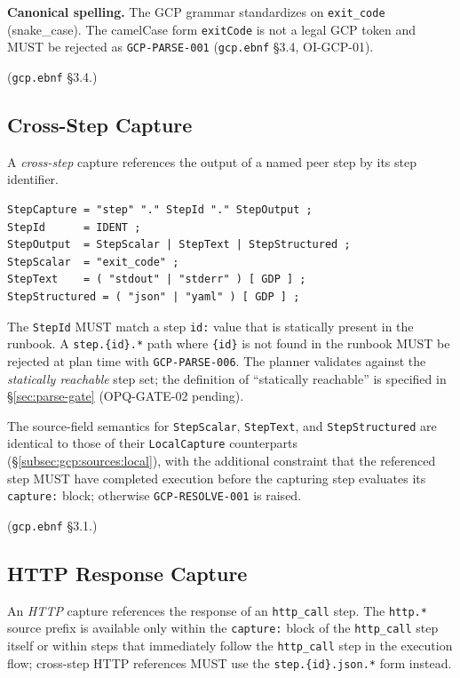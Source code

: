 \noindent\textbf{Canonical spelling.}
The GCP grammar standardizes on \texttt{exit\_code} (snake\_case).
The camelCase form \texttt{exitCode} is not a legal GCP token and MUST be
rejected as \texttt{GCP-PARSE-001} (\texttt{gcp.ebnf} \S3.4, OI-GCP-01).

(\texttt{gcp.ebnf} \S3.4.)

\subsection{Cross-Step Capture}
\label{subsec:gcp:sources:step}

A \emph{cross-step} capture references the output of a named peer step
by its step identifier.

\begin{verbatim}
StepCapture = "step" "." StepId "." StepOutput ;
StepId      = IDENT ;
StepOutput  = StepScalar | StepText | StepStructured ;
StepScalar  = "exit_code" ;
StepText    = ( "stdout" | "stderr" ) [ GDP ] ;
StepStructured = ( "json" | "yaml" ) [ GDP ] ;
\end{verbatim}

The \texttt{StepId} MUST match a step \texttt{id:} value that is
statically present in the runbook.
A \texttt{step.\{id\}.*} path where \texttt{\{id\}} is not found in the
runbook MUST be rejected at plan time with \texttt{GCP-PARSE-006}.
The planner validates against the \emph{statically reachable} step set;
the definition of ``statically reachable'' is specified in
\S\ref{sec:parse-gate} (OPQ-GATE-02 pending).

The source-field semantics for \texttt{StepScalar}, \texttt{StepText},
and \texttt{StepStructured} are identical to those of their
\texttt{LocalCapture} counterparts (\S\ref{subsec:gcp:sources:local}),
with the additional constraint that the referenced step MUST have
completed execution before the capturing step evaluates its
\texttt{capture:} block; otherwise \texttt{GCP-RESOLVE-001} is raised.

(\texttt{gcp.ebnf} \S3.1.)

\subsection{HTTP Response Capture}
\label{subsec:gcp:sources:http}

An \emph{HTTP} capture references the response of an \texttt{http\_call}
step.
The \texttt{http.*} source prefix is available only within the
\texttt{capture:} block of the \texttt{http\_call} step itself or within
steps that immediately follow the \texttt{http\_call} step in the
execution flow; cross-step HTTP references MUST use the
\texttt{step.\{id\}.json.*} form instead.

